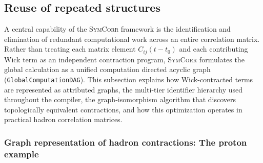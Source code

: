 \documentclass[a4paper,fleqn]{cas-dc}
\begin{document}
\subsection{Reuse of repeated structures}
\label{sec:reuse_repeated_structures}

A central capability of the \textsc{SymCorr} framework is the identification and elimination of redundant computational work across an entire correlation matrix. Rather than treating each matrix element \(C_{ij}(t-t_0)\) and each contributing Wick term as an independent contraction program, \textsc{SymCorr} formulates the global calculation as a unified computation directed acyclic graph (\texttt{GlobalComputationDAG}). This subsection explains how Wick-contracted terms are represented as attributed graphs, the multi-tier identifier hierarchy used throughout the compiler, the graph-isomorphism algorithm that discovers topologically equivalent contractions, and how this optimization operates in practical hadron correlation matrices.

\subsubsection{Graph representation of hadron contractions: The proton example}
\label{sec:graph_rep_proton}
\end{document}
